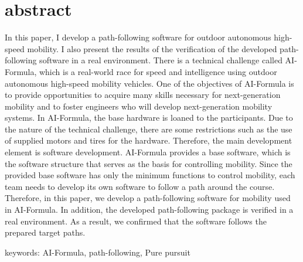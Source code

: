\chapter*{abstract}
\thispagestyle{empty}
%
\begin{center}
  \centering
  \scalebox{1.3}{Development of path-following software for}
  \scalebox{1.3}{outdoor autonomous high-speed mobility}
\end{center}
\vspace{1.0zh}
%
In this paper, I develop a path-following software for outdoor autonomous high-speed mobility.
I also present the results of the verification of the developed path-following software in a real environment.
There is a technical challenge called AI-Formula, which is a real-world race for speed and intelligence using outdoor autonomous high-speed mobility vehicles.
One of the objectives of AI-Formula is to provide opportunities to acquire many skills necessary for next-generation mobility and to foster engineers who will develop next-generation mobility systems.
%
In AI-Formula, the base hardware is loaned to the participants.
Due to the nature of the technical challenge, there are some restrictions such as the use of supplied motors and tires for the hardware.
Therefore, the main development element is software development.
%
AI-Formula provides a base software, which is the software structure that serves as the basis for controlling mobility.
Since the provided base software has only the minimum functions to control mobility, each team needs to develop its own software to follow a path around the course.
Therefore, in this paper, we develop a path-following software for mobility used in AI-Formula.
In addition, the developed path-following package is verified in a real environment.
As a result, we confirmed that the software follows the prepared target paths.
%
\vspace{2.0zh}

keywords: AI-Formula, path-following, Pure pursuit
